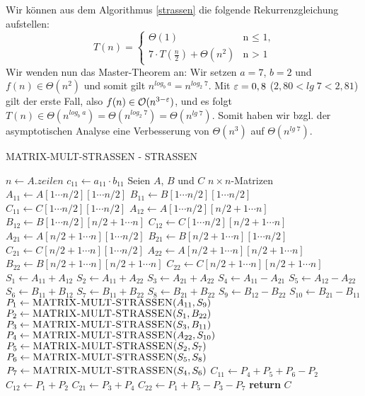 Wir können aus dem Algorithmus \ref{strassen} die folgende Rekurrenzgleichung aufstellen: 
\[ T(n) =  \begin{cases*}
                    \Theta(1) & \text{n $\leq$ 1,} \\
                    7 \cdot T\left(\frac{n}{2}\right) + \Theta(n^2) & \text{n > 1} 
                \end{cases*}
\]
Wir wenden nun das Master-Theorem an: Wir setzen $a = 7$, $b = 2$ und $f(n) \in \Theta(n^{2})$ und somit gilt $n^{log_b\;a} = n^{log_2\;7}$.
Mit $\varepsilon = 0,8$ ($2,80 < lg\;7 < 2,81$) gilt der erste Fall, also $f(n) \in \mathcal{O}(n^{3-\varepsilon})$, und es folgt $T(n) \in \Theta(n^{log_b\;a}) = \Theta(n^{log_2\;7}) = \Theta(n^{lg\;7})$. Somit haben wir bzgl. der asymptotischen Analyse eine Verbesserung von $\Theta(n^{3})$ auf $\Theta(n^{lg\;7})$.
\begin{algorithm}[hbt!]
\begin{algorithmic}[1]
\caption{MATRIX-MULT-STRASSEN - STRASSEN}
\label{strassen}
    \State $n\gets A.zeilen$
        \State $c_{11}\gets a_{11}\cdot b_{11}$
    \Else  
        \State Seien $A$, $B$ und $C$ $n \times n$-Matrizen
        \State $A_{11}\gets A[1\dotsb n/2][1\dotsb n/2]$
        \State $B_{11}\gets B[1\dotsb n/2][1\dotsb n/2]$
        \State $C_{11}\gets C[1\dotsb n/2][1\dotsb n/2]$
        \State $A_{12}\gets A[1\dotsb n/2][n/2 + 1\dotsb n]$
        \State $B_{12}\gets B[1\dotsb n/2][n/2 + 1\dotsb n]$
        \State $C_{12}\gets C[1\dotsb n/2][n/2 + 1\dotsb n]$
        \State $A_{21}\gets A[n/2 + 1\dotsb n][1\dotsb n/2]$
        \State $B_{21}\gets B[n/2 + 1\dotsb n][1\dotsb n/2]$
        \State $C_{21}\gets C[n/2 + 1\dotsb n][1\dotsb n/2]$
        \State $A_{22}\gets A[n/2 + 1\dotsb n][n/2 + 1\dotsb n]$
        \State $B_{22}\gets B[n/2 + 1\dotsb n][n/2 + 1\dotsb n]$
        \State $C_{22}\gets C[n/2 + 1\dotsb n][n/2 + 1\dotsb n]$
        \State $S_{1}\gets A_{11} + A_{12}$
        \State $S_{2}\gets A_{11} + A_{22}$
        \State $S_{3}\gets A_{21} + A_{22}$
        \State $S_{4}\gets A_{11} - A_{21}$
        \State $S_{5}\gets A_{12} - A_{22}$
        \State $S_{6}\gets B_{11} + B_{12}$
        \State $S_{7}\gets B_{11} + B_{22}$
        \State $S_{8}\gets B_{21} + B_{22}$
        \State $S_{9}\gets B_{12} - B_{22}$
        \State $S_{10}\gets B_{21} - B_{11}$
        \State $P_1\gets \Call{MATRIX-MULT-STRASSEN}{A_{11}, S_{9}}$ 
        \State $P_2\gets \Call{MATRIX-MULT-STRASSEN}{S_{1}, B_{22}}$
        \State $P_3\gets \Call{MATRIX-MULT-STRASSEN}{S_{3}, B_{11}}$
        \State $P_4\gets \Call{MATRIX-MULT-STRASSEN}{A_{22}, S_{10}}$
        \State $P_5\gets \Call{MATRIX-MULT-STRASSEN}{S_{2}, S_{7}}$
        \State $P_6\gets \Call{MATRIX-MULT-STRASSEN}{S_{5}, S_{8}}$
        \State $P_7\gets \Call{MATRIX-MULT-STRASSEN}{S_{4}, S_{6}}$
        \State $C_{11}\gets P_{4} + P_{5} + P_{6} - P_{2}$
        \State $C_{12}\gets P_{1} + P_{2}$
        \State $C_{21}\gets P_{3} + P_{4}$
        \State $C_{22}\gets P_{1} + P_{5} - P_{3} - P_{7}$
    \EndIf
    \State \textbf{return} $C$ 
\EndProcedure
\end{algorithmic}
\end{algorithm}